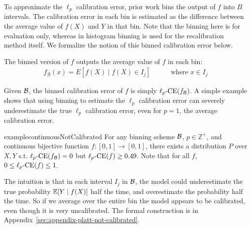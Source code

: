 To approximate the $\ell_p$ calibration error, prior work bins the output of $f$ into $B$ intervals.
The calibration error in each bin is estimated as the difference between the average value of $f(X)$ and $Y$ in that bin.
Note that the binning here is for evaluation only, whereas in histogram binning is used for the recalibration method itself.
We formalize the notion of this binned calibration error below.


\begin{definition}
The binned version of $f$ outputs the average value of $f$ in each bin:
\begin{align}
f_{\mathcal{B}}(x) = E[f(X) \mid f(X) \in I_j] \quad\quad\quad \mbox{where }x \in I_j
\end{align} 
\end{definition}

Given $\mathcal{B}{}$, the binned calibration error of $f$ is simply $\ell_p\mbox{-CE}(f_{\mathcal{B}{}})$.
A simple example shows that using binning to estimate the $\ell_p$ calibration error can severely underestimate the true $\ell_p$ calibration error, even for $p=1$, the average calibration error.

\begin{restatable}{example}{continuousNotCalibrated}
\label{ex:continuous-not-calibrated}
For any binning scheme $\mathcal{B}{}$, $p \in \mathbb{Z}^+$, and continuous bijective function $f : [0, 1] \to [0, 1]$, there exists a distribution $P$ over $X, Y$ s.t. $\ell_p\mbox{-CE}(f_{\mathcal{B}{}}) = 0$ but $\ell_p\mbox{-CE}(f) \geq 0.49$.
Note that for all $f$, $0 \leq \ell_p\mbox{-CE}(f) \leq 1$.
\end{restatable}

The intuition is that in each interval $I_j$ in $\mathcal{B}{}$, the model could underestimate the true probability $\mathbb{E}[Y \mid f(X)]$ half the time, and overestimate the probability half the time. So if we average over the entire bin the model appears to be calibrated, even though it is very uncalibrated. The formal construction is in Appendix~\ref{sec:appendix-platt-not-calibrated}.

